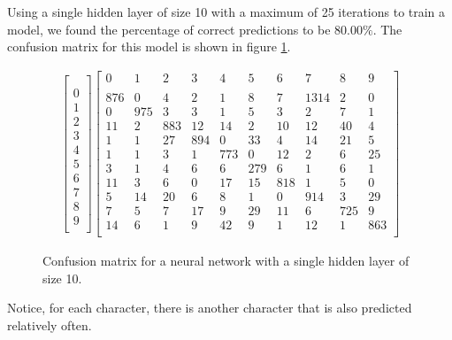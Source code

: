 \documentclass[11pt,a4paper]{article}
\begin{document}
Using a single hidden layer of size 10 with a maximum of 25 iterations to train a model, we found the percentage of correct predictions to be $80.00\%$. The confusion matrix for this model is shown in figure \ref{table:cm}.

\begin{figure}
\centering
\begin{align*}
\begin{bmatrix}
\\ \\0\\1\\2\\3\\4\\5\\6\\7\\8\\9\\
\end{bmatrix}
\begin{bmatrix}
  0 & 1 & 2 & 3 & 4 & 5 & 6 & 7 & 8 & 9 \\
  \\
  876 & 0 & 4 & 2 & 1 & 8 & 7 & 1314 & 2 & 0\\
  0 & 975 & 3 & 3 & 1 & 5 & 3 & 2 & 7 & 1\\
  11 & 2 & 883 & 12 & 14 & 2 & 10 & 12 & 40 & 4\\
  1 & 1 & 27 & 894 & 0 & 33 & 4 & 14 & 21 & 5\\
  1 & 1 & 3 & 1 & 773 & 0 & 12 & 2 & 6 & 25\\
  3 & 1 & 4 & 6 & 6 & 279 & 6 & 1 & 6 & 1\\
  11 & 3 & 6 & 0 & 17 & 15 & 818 & 1 & 5 & 0\\
  5 & 14 & 20 & 6 & 8 & 1 & 0 & 914 & 3 & 29\\
  7 & 5 & 7 & 17 & 9 & 29 & 11 & 6 & 725 & 9\\
  14 & 6 & 1 & 9 & 42 & 9 & 1 & 12 & 1 & 863\\
\end{bmatrix}
\end{align*}
\caption{Confusion matrix for a neural network with a single hidden layer of size 10.}
\label{table:cm}
\end{figure}

Notice, for each character, there is another character that is also predicted relatively often. 
\end{document}
